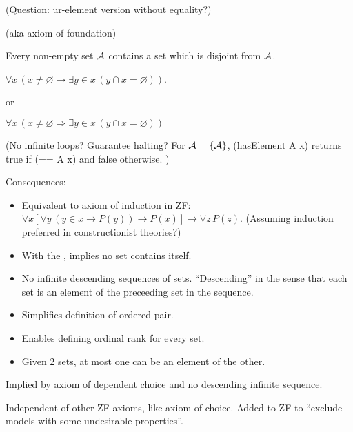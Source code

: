 (Question: ur-element version without equality?)


(aka axiom of foundation)~\cite{wiki:Axiom_of_regularity}

Every non-empty set $\mathcal{A}$ contains a set which is disjoint from $\mathcal{A}$.

$\forall x\,(x \neq \varnothing
\rightarrow 
\exists y\in x\,(y\cap x=\varnothing ))$.
 
or
 
$\forall x\,(x\neq \varnothing \Rightarrow 
 \exists y\in x\,(y\cap x=\varnothing ))$
 
(No infinite loops? Guarantee halting? 
For $\mathcal{A} = \{\mathcal{A}\}$,
\textsf{(hasElement A x)} 
returns \textsf{true} if \textsf{(== A x)}
and \textsf{false} otherwise. )

Consequences:
\begin{itemize}
\item 
Equivalent to axiom of induction\cite{wiki:Epsilon-induction} 
in \textsf{ZF}:
$\forall x
[\forall y\,(y\in x\rightarrow P(y))\rightarrow P(x)]
\rightarrow \forall z\,P(z)$.
(Assuming induction preferred in constructionist theories?)

\item With the , 
implies no set contains itself.

\item No infinite descending sequences of sets.
``Descending'' in the sense that each set is an element of the
preceeding set in the sequence.

\item Simplifies definition of ordered pair.

\item Enables defining ordinal rank for every set.

\item Given 2 sets, at most one can be an element of the other.
\end{itemize}

Implied by axiom of dependent choice and 
no descending infinite sequence.

Independent of other \textsf{ZF} axioms, like axiom of choice.
Added to \textsf{ZF} to 
``exclude models with some undesirable properties''.

\label{sec:Axiom-schema-of-specification}

